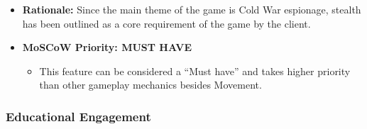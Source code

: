 \documentclass[11pt, a4paper]{article}
\begin{document}
\begin{itemize}

    \item \textbf{Rationale:} Since the main theme of the game is Cold War
          espionage, stealth has been outlined as a core requirement of the game
          by the client.

    \item \textbf{MoSCoW Priority: MUST HAVE}
          \begin{itemize}
              \item This feature can be considered a “Must have” and takes higher
                    priority than other gameplay mechanics besides Movement.
          \end{itemize}
\end{itemize}

\newpage

\subsubsection{Educational Engagement}
\end{document}
